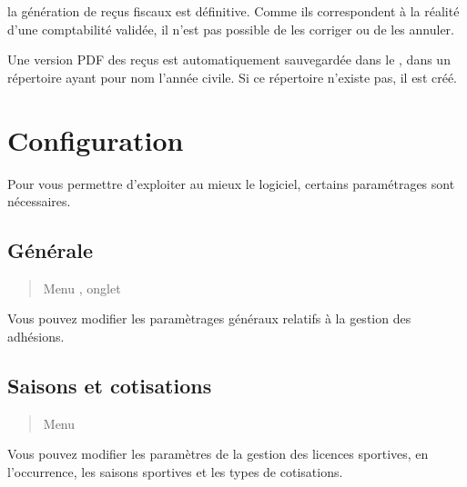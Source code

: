\documentclass[a4paper,10pt,oneside,french]{sphinxmanual}
\begin{document}
\sphinxAtStartPar
{} la génération de reçus fiscaux est définitive. Comme ils correspondent à la réalité d’une comptabilité validée, il n’est pas possible de les corriger ou de les annuler.

\sphinxAtStartPar
{} Une version PDF des reçus est automatiquement sauvegardée dans le , dans un répertoire ayant pour nom l’année civile. Si ce répertoire n’existe pas, il est créé.


\section{Configuration}
\label{\detokenize{member/config:configuration}}\label{\detokenize{member/config::doc}}
\sphinxAtStartPar
Pour vous permettre d’exploiter au mieux le logiciel, certains paramétrages sont nécessaires.


\subsection{Générale}
\label{\detokenize{member/config:generale}}\begin{quote}

\sphinxAtStartPar
Menu , onglet 
\end{quote}

\sphinxAtStartPar
Vous pouvez modifier les paramètrages généraux relatifs à la gestion des adhésions.
\begin{quote}

\noindent{}
\end{quote}


\subsection{Saisons et cotisations}
\label{\detokenize{member/config:saisons-et-cotisations}}\begin{quote}

\sphinxAtStartPar
Menu 
\end{quote}

\sphinxAtStartPar
Vous pouvez modifier les paramètres de la gestion des licences sportives, en l’occurrence, les saisons sportives et les types de cotisations.
\end{document}

